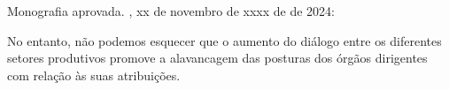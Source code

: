 \documentclass[
	12pt,				%
	oneside,			%
	a4paper,			%
	english,			%
	french,				%
	spanish,			%
	brazil				%
	]{abntex2}
\renewcommand{\ABNTEXchapterfont}{\normalfont} %
\begin{document}
\begin{folhadeaprovacao}

  \begin{center}
    {\ABNTEXchapterfont\large\imprimirautor}

    \vspace*{\fill}\vspace*{\fill}
    \begin{center}
      \ABNTEXchapterfont\bfseries\Large\imprimirtitulo
    \end{center}
    \vspace*{\fill}

    \hspace{.45\textwidth}
    \begin{minipage}{.5\textwidth}

    \imprimirpreambulo

    \end{minipage}%
    \vspace*{\fill}
   \end{center}

   Monografia aprovada. \imprimirlocal, xx de novembro de xxxx de  de 2024:


   \begin{center}
    \vspace*{0.5cm}
    {\large\imprimirlocal}
    \par
    {\large\imprimirdata}
    \vspace*{1cm}
  \end{center}

\end{folhadeaprovacao}
\begin{agradecimentos}

No entanto, não podemos esquecer que o aumento do diálogo entre os
diferentes setores produtivos promove a alavancagem das posturas dos
órgãos dirigentes com relação às suas atribuições.

\end{agradecimentos}
\end{document}
